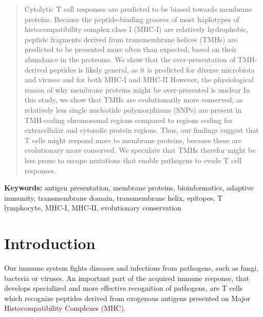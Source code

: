 \begin{abstract}

Cytolytic T cell responses are predicted to be biased towards membrane proteins. 
Because the peptide-binding grooves of most haplotypes 
of histocompatibility complex class I (MHC-I) are relatively hydrophobic, 
peptide fragments derived from transmembrane helices (TMHs) 
are predicted to be presented more often than expected,
based on their abundance in the proteome.
We show that the over-presentation of TMH-derived peptides is likely general, 
as it is predicted for diverse microbiota and viruses 
and for both MHC-I and MHC-II
However, the physiological reason of why membrane proteins might be 
over-presented is unclear
In this study, we show that TMHs are evolutionarily more conserved, 
as relatively less single nucleotide polymorphisms (SNPs) 
are present in TMH-coding chromosomal regions 
compared to regions coding for extracellular and cytosolic protein regions. 
Thus, our findings suggest that T cells might respond 
more to membrane proteins, because these are evolutionary more conserved.
We speculate that TMHs therefor might be less prone to escape mutations 
that enable pathogens to evade T cell responses.

\end{abstract}

{\bf Keywords:} antigen presentation, membrane proteins, bioinformatics, 
adaptive immunity, transmembrane domain, transmembrane helix, 
epitopes, T lymphocyte, MHC-I, MHC-II, evolutionary conservation

\section{Introduction}


Our immune system fights diseases and infections from pathogens, 
such as fungi, bacteria or viruses. 
An important part of the acquired immune response, 
that develops specialized and more effective recognition of pathogens, 
are T cells which recognize peptides derived from 
exogenous antigens presented on Major Histocompatibility Complexes (MHC). 


